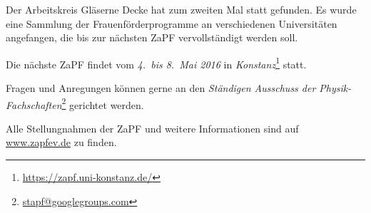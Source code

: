 Der Arbeitskreis \glqq{}Gläserne Decke\grqq{} hat zum zweiten Mal statt gefunden. Es wurde eine Sammlung der Frauenförderprogramme an verschiedenen Universitäten angefangen, die bis zur nächsten ZaPF vervollständigt werden soll.

\vspace{0.5cm}

Die nächste ZaPF findet vom \emph{4.\ bis 8.\ Mai 2016} in \emph{Konstanz}\footnote{\href{https://zapf.uni-konstanz.de/}{\url{https://zapf.uni-konstanz.de/}}} statt.

Fragen und Anregungen können gerne an den \emph{Ständigen Ausschuss der Physik-Fachschaften}\footnote{\href{mailto:stapf@googlegroups.com}{\url{stapf@googlegroups.com}}} gerichtet werden.

Alle Stellungnahmen der ZaPF und weitere Informationen sind auf \href{http://www.zapfev.de}{\url{www.zapfev.de}} zu finden.

